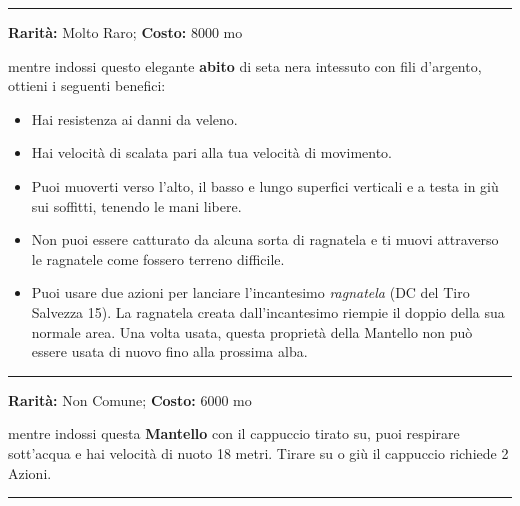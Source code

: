 \begin{multicols}{2}
\smallskip\noindent\rule{\linewidth}{2pt}  \hypertarget{Mantellodell'Aracnide}{}\medskip{}\noindent\label{Mantellodell'Aracnide}

\textbf{Rarità:} Molto Raro; \textbf{Costo:} 8000 mo

mentre indossi questo elegante \textbf{abito} di seta nera intessuto con fili d'argento, ottieni i seguenti benefici:

\medskip

\begin{itemize}[leftmargin=*] \setlength{\itemsep}{0pt}
\item
Hai resistenza ai danni da veleno.
\item
Hai velocità di scalata pari alla tua velocità di movimento.
\item
Puoi muoverti verso l'alto, il basso e lungo superfici verticali e a testa in giù sui soffitti, tenendo le mani libere.
\item
Non puoi essere catturato da alcuna sorta di ragnatela e ti muovi attraverso le ragnatele come fossero terreno difficile.
\item
Puoi usare due azioni per lanciare l'incantesimo \emph{ragnatela} (DC del Tiro Salvezza 15). La ragnatela creata dall'incantesimo riempie il doppio della sua normale area. Una volta usata, questa proprietà della Mantello non può essere usata di nuovo fino alla prossima alba.
\end{itemize}

\smallskip\noindent\rule{\linewidth}{2pt}  \hypertarget{MantellodellaManta}{}\medskip{}\noindent\label{MantellodellaManta}

\textbf{Rarità:} Non Comune; \textbf{Costo:} 6000 mo

mentre indossi questa \textbf{Mantello} con il cappuccio tirato su, puoi respirare sott'acqua e hai velocità di nuoto 18 metri. Tirare su o giù il cappuccio richiede 2 Azioni.

\smallskip\noindent\rule{\linewidth}{2pt}  \hypertarget{MantellodellaResistenzaagliIncantesimi}{}\medskip{}\noindent\label{MantellodellaResistenzaagliIncantesimi}


\end{multicols}
